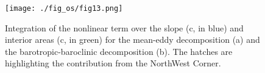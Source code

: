 \documentclass{ametsoc}
\begin{document}
\begin{figure}[t]
\centerline{\texttt{[image: ./fig\_os/fig13.png]}}
\caption{Integration of the nonlinear term over the slope (c, in blue) and interior areas (c, in green) for the mean-eddy decomposition (a) and the barotropic-baroclinic decomposition (b). The hatches are highlighting the contribution from the NorthWest Corner.}
\label{int_NL}
\end{figure} 


\end{document}

